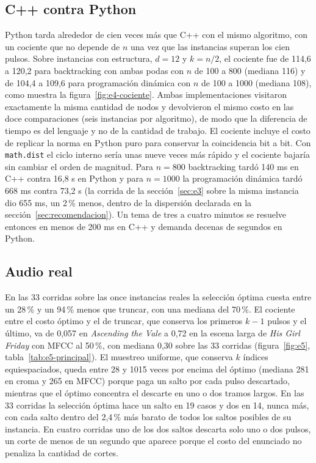 \subsection{C++ contra Python}
\label{sec:e4}

Python tarda alrededor de cien veces más que C++ con el mismo algoritmo, con un cociente que no depende de $n$ una vez que las instancias superan los cien pulsos. Sobre instancias con estructura, $d = 12$ y $k = n/2$, el cociente fue de 114,6 a 120,2 para backtracking con ambas podas con $n$ de 100 a 800 (mediana 116) y de 104,4 a 109,6 para programación dinámica con $n$ de 100 a 1000 (mediana 108), como muestra la figura~\ref{fig:e4-cociente}. Ambas implementaciones visitaron exactamente la misma cantidad de nodos y devolvieron el mismo costo en las doce comparaciones (seis instancias por algoritmo), de modo que la diferencia de tiempo es del lenguaje y no de la cantidad de trabajo. El cociente incluye el costo de replicar la norma en Python puro para conservar la coincidencia bit a bit. Con \texttt{math.dist} el ciclo interno sería unas nueve veces más rápido y el cociente bajaría sin cambiar el orden de magnitud. Para $n = 800$ backtracking tardó 140 ms en C++ contra 16,8 s en Python y para $n = 1000$ la programación dinámica tardó 668 ms contra 73,2 s (la corrida de la sección~\ref{sec:e3} sobre la misma instancia dio 655 ms, un 2\,\% menos, dentro de la dispersión declarada en la sección~\ref{sec:recomendacion}). Un tema de tres a cuatro minutos se resuelve entonces en menos de 200 ms en C++ y demanda decenas de segundos en Python.

\subsection{Audio real}
\label{sec:e5}

En las 33 corridas sobre las once instancias reales la selección óptima cuesta entre un 28\,\% y un 94\,\% menos que truncar, con una mediana del 70\,\%. El cociente entre el costo óptimo y el de truncar, que conserva los primeros $k-1$ pulsos y el último, va de 0,057 en \emph{Ascending the Vale} a 0,72 en la escena larga de \emph{His Girl Friday} con MFCC al 50\,\%, con mediana 0,30 sobre las 33 corridas (figura~\ref{fig:e5}, tabla~\ref{tab:e5-principal}). El muestreo uniforme, que conserva $k$ índices equiespaciados, queda entre 28 y 1015 veces por encima del óptimo (mediana 281 en croma y 265 en MFCC) porque paga un salto por cada pulso descartado, mientras que el óptimo concentra el descarte en uno o dos tramos largos. En las 33 corridas la selección óptima hace un salto en 19 casos y dos en 14, nunca más, con cada salto dentro del 2,4\,\% más barato de todos los saltos posibles de su instancia. En cuatro corridas uno de los dos saltos descarta solo uno o dos pulsos, un corte de menos de un segundo que aparece porque el costo del enunciado no penaliza la cantidad de cortes.

